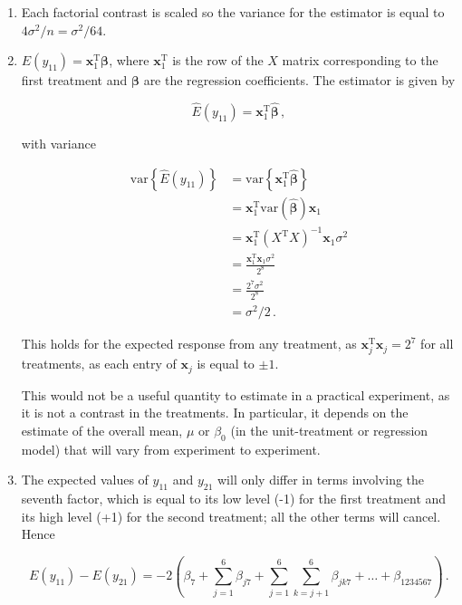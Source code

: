 \documentclass[
]{book}
\theoremstyle{definition}
\theoremstyle{definition}
\theoremstyle{definition}
\theoremstyle{definition}
\theoremstyle{remark}
\begin{document}
\begin{enumerate}
\def\labelenumi{\alph{enumi}.}
\item
  Each factorial contrast is scaled so the variance for the estimator is equal to \(4\sigma^2/n = \sigma^2 / 64\).
\item
  \(E(y_11) = \boldsymbol{x}_1^{\mathrm{T}}\boldsymbol{\beta}\), where \(\boldsymbol{x}_1^{\mathrm{T}}\) is the row of the \(X\) matrix corresponding to the first treatment and \(\boldsymbol{\beta}\) are the regression coefficients. The estimator is given by

  \[
  \hat{E}(y_{11}) = \boldsymbol{x}_1^{\mathrm{T}}\hat{\boldsymbol{\beta}}\,,
  \]

  with variance

  \begin{align*}
  \mathrm{var}\left\{\hat{E}(y_{11})\right\} & = \mathrm{var}\left\{\boldsymbol{x}_1^{\mathrm{T}}\hat{\boldsymbol{\beta}}\right\} \\
  & = \boldsymbol{x}_1^{\mathrm{T}}\mbox{var}(\hat{\boldsymbol{\beta}})\boldsymbol{x}_1 \\
  & = \boldsymbol{x}_1^{\mathrm{T}}\left(X^\mathrm{T}X\right)^{-1}\boldsymbol{x}_1\sigma^2 \\
  & = \frac{\boldsymbol{x}_1^{\mathrm{T}}\boldsymbol{x}_1\sigma^2}{2^8} \\
  & = \frac{2^7\sigma^2}{2^8} \\
  & = \sigma^2 / 2\,.
  \end{align*}

  This holds for the expected response from any treatment, as \(\boldsymbol{x}_j^{\mathrm{T}}\boldsymbol{x}_j = 2^7\) for all treatments, as each entry of \(\boldsymbol{x}_j\) is equal to \(\pm 1\).

  This would not be a useful quantity to estimate in a practical experiment, as it is not a contrast in the treatments. In particular, it depends on the estimate of the overall mean, \(\mu\) or \(\beta_0\) (in the unit-treatment or regression model) that will vary from experiment to experiment.
\item
  The expected values of \(y_{11}\) and \(y_{21}\) will only differ in terms involving the seventh factor, which is equal to its low level (-1) for the first treatment and its high level (+1) for the second treatment; all the other terms will cancel. Hence

  \[
  E(y_{11}) - E(y_{21}) = -2\left(\beta_7 + \sum_{j=1}^6\beta_{j7} + \sum_{j=1}^6\sum_{k=j+1}^6\beta_{jk7} + \ldots + \beta_{1234567}\right)\,.
  \]


\end{enumerate}
\end{document}
